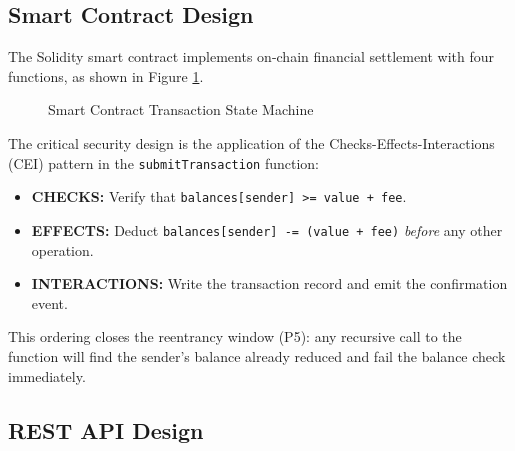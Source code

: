 \documentclass[12pt,a4paper]{report}
\begin{document}
\subsection{Smart Contract Design}

The Solidity smart contract implements on-chain financial settlement with four functions,
as shown in Figure \ref{fig:contract}.

\begin{figure}[H]
  \centering
  \caption{Smart Contract Transaction State Machine}
  \label{fig:contract}
\end{figure}

The critical security design is the application of the Checks-Effects-Interactions (CEI)
pattern in the \texttt{submitTransaction} function:

\begin{itemize}
  \item \textbf{CHECKS:} Verify that \texttt{balances[sender] >= value + fee}.
  \item \textbf{EFFECTS:} Deduct \texttt{balances[sender] -= (value + fee)} \textit{before}
        any other operation.
  \item \textbf{INTERACTIONS:} Write the transaction record and emit the confirmation event.
\end{itemize}

This ordering closes the reentrancy window (P5): any recursive call to the function will
find the sender's balance already reduced and fail the balance check immediately.

\subsection{REST API Design}
\end{document}
